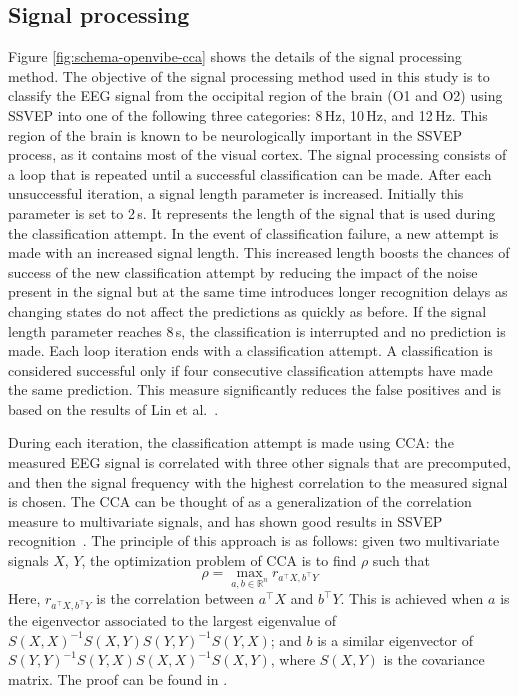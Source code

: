 \documentclass[smallextended]{svjour3}
\begin{document}
\subsection{Signal processing}

Figure \ref{fig:schema-openvibe-cca} shows the details of the signal processing method.
The objective of the signal processing method used in this study is to classify the EEG signal from the occipital region of the brain (O1 and O2) using SSVEP into one of the following three categories: 8\,Hz, 10\,Hz, and 12\,Hz.
This region of the brain is known to be neurologically important in the SSVEP process, as it contains most of the visual cortex.
The signal processing consists of a loop that is repeated until a successful classification can be made.
After each unsuccessful iteration, a signal length parameter is increased. Initially this parameter is set to 2\,s.
It represents the length of the signal that is used during the classification attempt.
In the event of classification failure, a new attempt is made with an increased signal length.
This increased length boosts the chances of success of the new classification attempt by reducing the impact of the noise present in the signal
but at the same time introduces longer recognition delays as changing states do not affect the predictions as quickly as before.
If the signal length parameter reaches 8\,s, the classification is interrupted and no prediction is made.
Each loop iteration ends with a classification attempt.
A classification is considered successful only if four consecutive classification attempts have made the same prediction. This measure significantly reduces the false positives and is based on the results of Lin et al.~\cite{Lin2014}.

During each iteration, the classification attempt is made using CCA: the measured EEG signal is correlated with three other signals that are precomputed, and then the signal frequency with the highest correlation to the measured signal is chosen.
The CCA can be thought of as a generalization of the correlation measure to multivariate signals, and has shown good results in SSVEP recognition~\cite{Lin2014}. The principle of this approach is as follows: given two multivariate signals $X$, $Y$, the optimization problem of CCA is to find $\rho$ such that
\\
\begin{equation}
\label{rho}
\rho = \max_{a, b \in \mathbb R^n} r_{ a^\top X, b^\top Y}
\end{equation}
Here, $r_{a^\top X, b^\top Y}$ is the correlation between $a^\top X$ and $b^\top Y$. This is achieved when $a$ is the eigenvector associated to the largest eigenvalue of $S(X, X)^{-1} S(X,Y) S(Y, Y)^{-1} S(Y, X)$; and $b$ is a similar eigenvector of $S(Y, Y)^{-1} S(Y, X) S(X, X)^{-1} S(X, Y)$, where $S(X, Y)$ is the covariance matrix. The proof can be found in \cite{rencher2003}.
\end{document}
